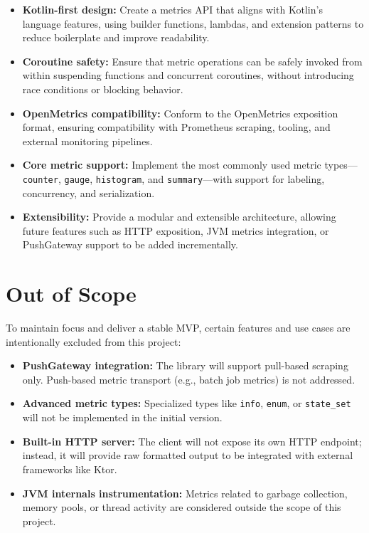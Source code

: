 \begin{itemize}
  \item \textbf{Kotlin-first design:} Create a metrics API that aligns with Kotlin’s language features, using builder functions, lambdas, and extension patterns to reduce boilerplate and improve readability.
  \item \textbf{Coroutine safety:} Ensure that metric operations can be safely invoked from within suspending functions and concurrent coroutines, without introducing race conditions or blocking behavior.
  \item \textbf{OpenMetrics compatibility:} Conform to the OpenMetrics exposition format, ensuring compatibility with Prometheus scraping, tooling, and external monitoring pipelines.
  \item \textbf{Core metric support:} Implement the most commonly used metric types—\texttt{counter}, \texttt{gauge}, \texttt{histogram}, and \texttt{summary}—with support for labeling, concurrency, and serialization.
  \item \textbf{Extensibility:} Provide a modular and extensible architecture, allowing future features such as HTTP exposition, JVM metrics integration, or PushGateway support to be added incrementally.
\end{itemize}

\section{Out of Scope}

To maintain focus and deliver a stable MVP, certain features and use cases are intentionally excluded from this project:

\begin{itemize}
  \item \textbf{PushGateway integration:} The library will support pull-based scraping only. Push-based metric transport (e.g., batch job metrics) is not addressed.
  \item \textbf{Advanced metric types:} Specialized types like \texttt{info}, \texttt{enum}, or \texttt{state\_set} will not be implemented in the initial version.
  \item \textbf{Built-in HTTP server:} The client will not expose its own HTTP endpoint; instead, it will provide raw formatted output to be integrated with external frameworks like Ktor.
  \item \textbf{JVM internals instrumentation:} Metrics related to garbage collection, memory pools, or thread activity are considered outside the scope of this project.
\end{itemize}

